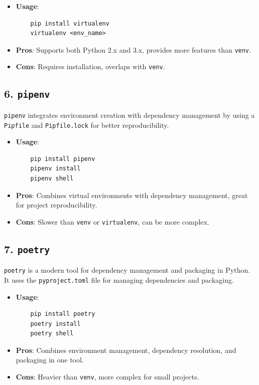 \documentclass{article}
\begin{document}
\begin{itemize}
    \item \textbf{Usage}: 
    \begin{verbatim}
    pip install virtualenv
    virtualenv <env_name>
    \end{verbatim}
    \item \textbf{Pros}: Supports both Python 2.x and 3.x, provides more features than \texttt{venv}.
    \item \textbf{Cons}: Requires installation, overlaps with \texttt{venv}.
\end{itemize}

\subsection{6. \texttt{pipenv}}
\texttt{pipenv} integrates environment creation with dependency management by using a \texttt{Pipfile} and \texttt{Pipfile.lock} for better reproducibility.

\begin{itemize}
    \item \textbf{Usage}: 
    \begin{verbatim}
    pip install pipenv
    pipenv install
    pipenv shell
    \end{verbatim}
    \item \textbf{Pros}: Combines virtual environments with dependency management, great for project reproducibility.
    \item \textbf{Cons}: Slower than \texttt{venv} or \texttt{virtualenv}, can be more complex.
\end{itemize}

\subsection{7. \texttt{poetry}}
\texttt{poetry} is a modern tool for dependency management and packaging in Python. It uses the \texttt{pyproject.toml} file for managing dependencies and packaging.

\begin{itemize}
    \item \textbf{Usage}: 
    \begin{verbatim}
    pip install poetry
    poetry install
    poetry shell
    \end{verbatim}
    \item \textbf{Pros}: Combines environment management, dependency resolution, and packaging in one tool.
    \item \textbf{Cons}: Heavier than \texttt{venv}, more complex for small projects.
\end{itemize}
\end{document}

